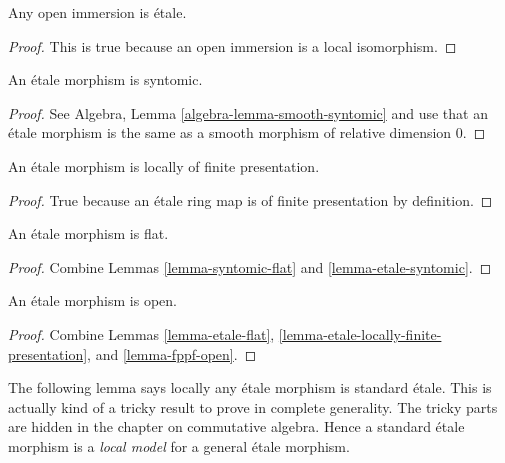 \begin{lemma}
\label{lemma-open-immersion-etale}
Any open immersion is \'etale.
\end{lemma}

\begin{proof}
This is true because an open immersion is a local isomorphism.
\end{proof}

\begin{lemma}
\label{lemma-etale-syntomic}
An \'etale morphism is syntomic.
\end{lemma}

\begin{proof}
See Algebra, Lemma \ref{algebra-lemma-smooth-syntomic} and use that an
\'etale morphism is the same as a smooth morphism of relative dimension $0$.
\end{proof}

\begin{lemma}
\label{lemma-etale-locally-finite-presentation}
An \'etale morphism is locally of finite presentation.
\end{lemma}

\begin{proof}
True because an \'etale ring map is of finite presentation by
definition.
\end{proof}

\begin{lemma}
\label{lemma-etale-flat}
An \'etale morphism is flat.
\end{lemma}

\begin{proof}
Combine Lemmas \ref{lemma-syntomic-flat} and \ref{lemma-etale-syntomic}.
\end{proof}

\begin{lemma}
\label{lemma-etale-open}
An \'etale morphism is open.
\end{lemma}

\begin{proof}
Combine Lemmas \ref{lemma-etale-flat},
\ref{lemma-etale-locally-finite-presentation}, and
\ref{lemma-fppf-open}.
\end{proof}

\noindent
The following lemma says locally any \'etale morphism is standard \'etale.
This is actually kind of a tricky result to prove in complete generality.
The tricky parts are hidden in the chapter on commutative algebra.
Hence a standard \'etale morphism is a {\it local model} for a general
\'etale morphism.

